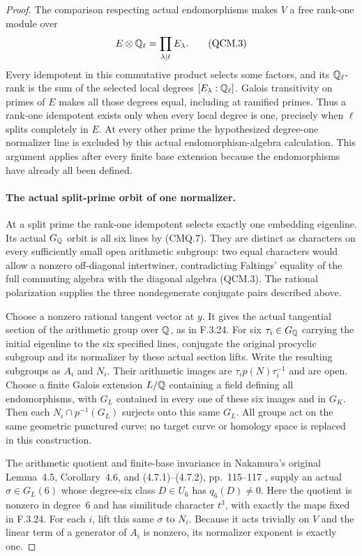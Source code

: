 \begin{proof}
The comparison respecting actual endomorphisms makes
$V$ a free rank-one module over
\[
                E\otimes\mathbb Q_\ell=\prod_{\lambda\mid\ell}E_\lambda.
                                                               \tag{QCM.3}
\]
Every idempotent in this commutative product selects
some factors, and its $\mathbb Q_\ell$-rank is the sum of
the selected local degrees $[E_\lambda:\mathbb Q_\ell]$.
Galois transitivity on primes of $E$ makes all those
degrees equal, including at ramified primes.
Thus a rank-one idempotent exists only when every
local degree is one, precisely when $\ell$ splits
completely in $E$. At every other prime the
hypothesized degree-one normalizer line is excluded
by this actual endomorphism-algebra calculation.
This argument applies after every finite base
extension because the endomorphisms have already
all been defined.

\paragraph{The actual split-prime orbit of one normalizer.}
At a split prime the rank-one idempotent selects
exactly one embedding eigenline. Its actual
$G_{\mathbb Q}$ orbit is all six lines by (CMQ.7).
They are distinct as characters on every sufficiently
small open arithmetic subgroup: two equal characters
would allow a nonzero off-diagonal intertwiner,
contradicting Faltings' equality of the full commuting
algebra with the diagonal algebra (QCM.3).
The rational polarization supplies the three
nondegenerate conjugate pairs described above.

Choose a nonzero rational tangent vector at $y$.
It gives the actual tangential section of the
arithmetic group over $\mathbb Q$, as in F.3.24. For six
$\tau_i\in G_{\mathbb Q}$ carrying the initial eigenline
to the six specified lines, conjugate the original
procyclic subgroup and its normalizer by these
actual section lifts. Write the resulting subgroups
as $A_i$ and $N_i$. Their arithmetic images are
$\tau_i p(N)\tau_i^{-1}$ and are open. Choose a
finite Galois extension $L/\mathbb Q$ containing a field
defining all endomorphisms, with $G_L$ contained
in every one of these six images and in $G_K$.
Then each $N_i\cap p^{-1}(G_L)$ surjects onto
this same $G_L$. All groups act on the same
geometric punctured curve; no target curve or
homology space is replaced in this construction.

The arithmetic quotient and finite-base invariance
in Nakamura's original Lemma~4.5, Corollary~4.6,
and (4.7.1)--(4.7.2), pp.~115--117
\cite{AuditNakamura1996}, supply an actual
$\sigma\in G_L(6)$ whose degree-six class
$D\in U_6$ has $q_6(D)\ne0$. Here the quotient
is nonzero in degree~6 and has similitude character
$t^3$, with exactly the maps fixed in F.3.24.
For each $i$, lift this same $\sigma$ to $N_i$.
Because it acts trivially on $V$ and the linear
term of a generator of $A_i$ is nonzero, its
normalizer exponent is exactly one.


\end{proof}
